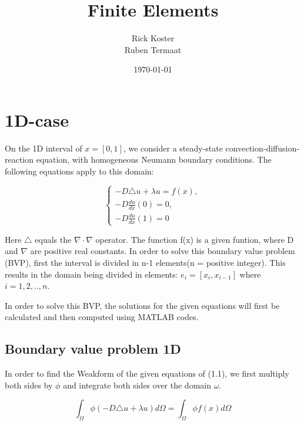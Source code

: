 \documentclass{report}
\begin{document}
\title{\Huge Finite Elements}
\author{Rick Koster \\ Ruben Termaat}
\date{\today}
	
\maketitle

\tableofcontents


\chapter{1D-case}



On the 1D interval of $x = [0,1]  $, we consider a steady-state convection-diffusion-reaction equation, with homogeneous Neumann boundary conditions. The following equations apply to this domain:

\begin{equation}
\begin{cases} 
-D\triangle u + \lambda u = f(x),\\ -D\frac{du}{dx}(0) = 0 ,\\ -D\frac{du}{dx}(1) = 0
\end{cases} 
\end{equation}
\bigskip

Here $ \triangle$ equals the $\nabla \cdot \nabla$ operator. The function f(x) is a given funtion, where D and $\nabla$ are positive real constants. In order to solve this boundary value problem (BVP), first the interval is divided in n-1 elements(n = positive integer). This results in the domain being divided in elements: $e_i = [x_i, x_{i-1}]$ where $i={1,2,..,n}$. 

In order to solve this BVP, the solutions for the given equations will first be calculated and then computed using MATLAB codes.


\section{Boundary value problem 1D}
\vspace{5mm}

In order to find the Weakform of the given equations of (1.1), we first multiply both sides by $\phi$ and integrate both sides over the domain $\omega$.


\begin{equation}
	 \int_{\Omega} \phi(-D\triangle u + \lambda u )d\Omega = \int_{\Omega} \phi f(x) d\Omega 
\end{equation}	
\smallskip
\end{document}
